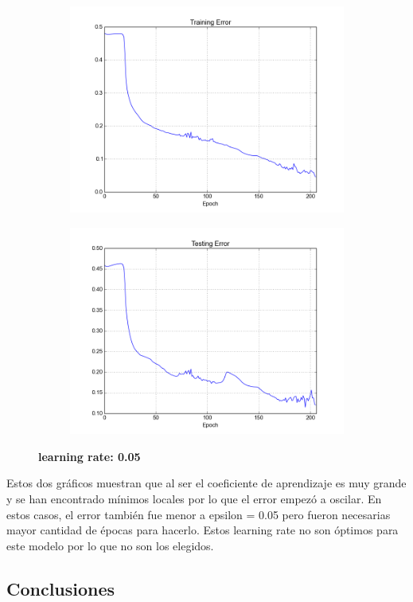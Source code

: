 \begin{figure}[h]	
	\begin{subfigure}[b]{0.5\textwidth}
		\includegraphics[width=\linewidth]{fig/trainingerror_lr0,05_eps0,05_regparam0,00_beta5_batch1.png}
	\end{subfigure}
	\begin{subfigure}[b]{0.5\textwidth}
		\includegraphics[width=\linewidth]{fig/valerror_lr0,05_eps0,05_regparam0,00_beta5_batch1.png}
	\end{subfigure}

	\caption{\textbf{learning rate: 0.05}}
\end{figure}

Estos dos gráficos muestran que al ser el coeficiente de aprendizaje es muy grande y se han encontrado mínimos locales por lo que el error empezó a oscilar. 
En estos casos, el error también fue menor a epsilon = 0.05 pero fueron necesarias mayor cantidad de épocas para hacerlo. Estos learning rate no son óptimos para este modelo por lo que no son los elegidos.


\subsection{Conclusiones}






